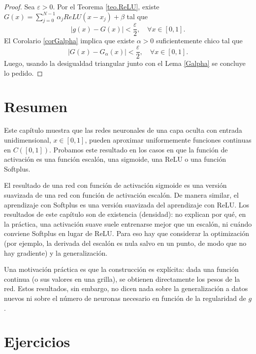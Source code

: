 \documentclass[12pt, a4paper]{amsbook}
\newcommand{\ve}{\varepsilon}
\theoremstyle{remark}
\theoremstyle{definition}
\numberwithin{section}{chapter}
\numberwithin{subsection}{section}
\numberwithin{equation}{section}
\numberwithin{figure}{chapter}
\begin{document}
\begin{proof}
Sea $\ve>0$. Por el Teorema \ref{teo.ReLU}, existe $G(x) = \sum_{j=0}^{N-1}\alpha_j ReLU(x-x_j)+\beta$ tal que
$$
|g(x)-G(x)| < \frac{\ve}{2}, \quad \forall x\in [0,1].
$$
El Corolario \ref{corGalpha} implica que existe $\alpha>0$ suficientemente chico tal que
$$
|G(x)-G_\alpha(x)|<\frac{\ve}{2},\quad \forall x\in [0,1].
$$
Luego, usando la desigualdad triangular junto con el Lema \ref{Galpha} se concluye lo pedido.
\end{proof}

\section{Resumen}\label{sec.c8.6}
Este capítulo muestra que las redes neuronales de una capa oculta con entrada unidimensional, $x\in [0,1]$, pueden aproximar uniformemente funciones continuas en $C([0, 1])$. Probamos este resultado en los casos en que la función de activación es una función escalón, una sigmoide, una ReLU o una función Softplus.

El resultado de una red con función de activación sigmoide es una versión suavizada de una red con función de activación escalón. De manera similar, el aprendizaje con Softplus es una versión suavizada del aprendizaje con ReLU. Los resultados de este capítulo son de existencia (densidad): no explican por qué, en la práctica, una activación suave suele entrenarse mejor que un escalón, ni cuándo conviene Softplus en lugar de ReLU. Para eso hay que considerar la optimización (por ejemplo, la derivada del escalón es nula salvo en un punto, de modo que no hay gradiente) y la generalización.

Una motivación práctica es que la construcción es explícita: dada una función continua (o sus valores en una grilla), se obtienen directamente los pesos de la red. Estos resultados, sin embargo, no dicen nada sobre la generalización a datos nuevos ni sobre el número de neuronas necesario en función de la regularidad de $g$.

\section{Ejercicios}\label{sec.c8.7}
\end{document}
